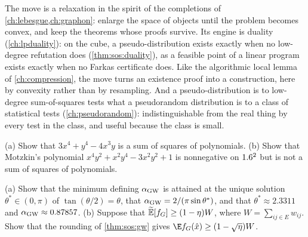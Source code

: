 \begin{refsection}

The move is a relaxation in the spirit of the completions of \cref{ch:lebesgue,ch:graphon}: enlarge the space of objects until the problem becomes convex, and keep the theorems whose proofs survive. Its engine is duality (\cref{ch:lpduality}): on the cube, a pseudo-distribution exists exactly when no low-degree refutation does (\cref{thm:sos:duality}), as a feasible point of a linear program exists exactly when no Farkas certificate does. Like the algorithmic local lemma of \cref{ch:compression}, the move turns an existence proof into a construction, here by convexity rather than by resampling. And a pseudo-distribution is to low-degree sum-of-squares tests what a pseudorandom distribution is to a class of statistical tests (\cref{ch:pseudorandom}): indistinguishable from the real thing by every test in the class, and useful because the class is small.

\begin{exercises}
\item\label{ex:sos:motzkin} \consolidation\hard (a) Show that $3x^4+y^4-4x^3y$ is a sum of squares of polynomials. (b) Show that Motzkin's polynomial $x^4y^2+x^2y^4-3x^2y^2+1$ is nonnegative on $1.6^2$ but is not a sum of squares of polynomials. 

\item\label{ex:sos:gw} \consolidation (a) Show that the minimum defining $\alpha_{\mathrm{GW}}$ is attained at the unique solution $\theta^*\in(0,\pi)$ of $\tan(\theta/2)=\theta$, that $\alpha_{\mathrm{GW}}=2/(\pi\sin\theta^*)$, and that $\theta^*\approx2.3311$ and $\alpha_{\mathrm{GW}}\approx0.87857$. (b) Suppose that $\widetilde{\mathbb{E}}[f_G]\ge(1-\eta)W$, where $W=\sum_{ij\in E}w_{ij}$. Show that the rounding of \cref{thm:sos:gw} gives $\E f_G(\hat x)\ge(1-\sqrt\eta)W$. 


\end{exercises}
\end{refsection}
